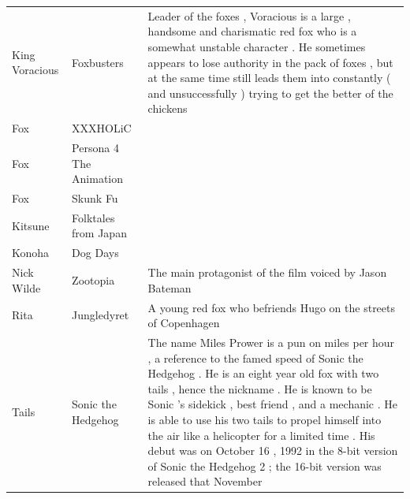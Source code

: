 \documentclass{article}
\begin{document}
\begin{tabular}{lll}
King Voracious & Foxbusters & Leader of the foxes , Voracious is a large , handsome and charismatic red fox who is a somewhat unstable character . He sometimes appears to lose authority in the pack of foxes , but at the same time still leads them into constantly ( and unsuccessfully ) trying to get the better of the chickens \\
Fox & XXXHOLiC &  \\
Fox & Persona 4 The Animation &  \\
Fox & Skunk Fu &  \\
Kitsune & Folktales from Japan &  \\
Konoha & Dog Days &  \\
Nick Wilde & Zootopia & The main protagonist of the film voiced by Jason Bateman \\
Rita & Jungledyret & A young red fox who befriends Hugo on the streets of Copenhagen \\
Tails & Sonic the Hedgehog & The name Miles Prower is a pun on miles per hour , a reference to the famed speed of Sonic the Hedgehog . He is an eight year old fox with two tails , hence the nickname . He is known to be Sonic 's sidekick , best friend , and a mechanic . He is able to use his two tails to propel himself into the air like a helicopter for a limited time . His debut was on October 16 , 1992 in the 8-bit version of Sonic the Hedgehog 2 ; the 16-bit version was released that November \\
\bottomrule
\end{tabular}
\end{document}
